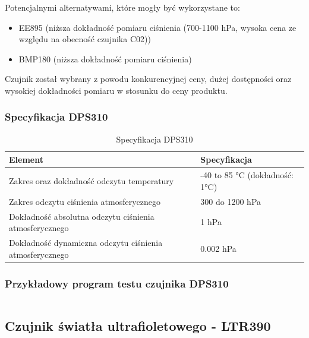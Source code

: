 \documentclass[12pt,a4paper]{article}
\begin{document}
Potencjalnymi alternatywami, które mogły być wykorzystane to:
\begin{itemize}
    \item EE895 (niższa dokładność pomiaru ciśnienia (700-1100 hPa, wysoka cena ze względu na obecność czujnika C02))
    \item BMP180 (niższa dokładność pomiaru ciśnienia)
\end{itemize}

Czujnik został wybrany z powodu konkurencyjnej ceny, dużej dostępności oraz wysokiej dokładności pomiaru w stosunku do ceny produktu.

\subsubsection{Specyfikacja DPS310}

\begin{table}[H]
    \centering
    \begin{tabular}{|l|l|}
        \hline
        Element & Specyfikacja \\
        \hline
        Zakres oraz dokładność odczytu temperatury & -40 to 85 °C (dokładność: 1°C) \\
        \hline
        Zakres odczytu ciśnienia atmosferycznego & 300 do 1200 hPa \\
        \hline
        Dokładność absolutna odczytu ciśnienia atmosferycznego & 1 hPa \\
        \hline
        Dokładność dynamiczna odczytu ciśnienia atmosferycznego & 0.002 hPa \\
        \hline
    \end{tabular}
    \caption{Specyfikacja DPS310}
    \label{dps310-spec}
\end{table}

\subsubsection{Przykładowy program testu czujnika DPS310}

\begin{code}[H]
\inputminted[frame=lines,]{c}{../proj/dps310-test/dps310-test.ino}

\caption{Test czujnika DPS310}
\end{code}

\subsection{Czujnik światła ultrafioletowego - LTR390}
\end{document}
